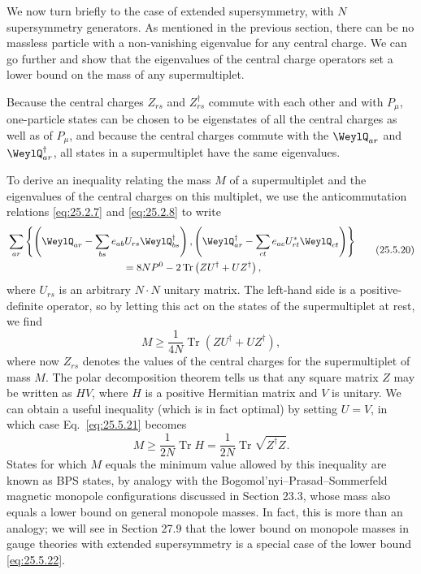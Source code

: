 We now turn briefly to the case of extended supersymmetry, with $N$
supersymmetry generators. As mentioned in the previous section, there can be
no massless particle with a non-vanishing eigenvalue for any central charge.
We can go further and show that the eigenvalues of the central charge
operators set a lower bound on the mass of any supermultiplet.

Because the central charges $Z_{rs}$ and $Z_{rs}^\dagger$ commute with each
other and with $P_\mu$, one-particle states can be chosen to be eigenstates of
all the central charges as well as of $P_\mu$, and because the central charges
commute with the $\WeylQ_{ar}$ and $\WeylQ_{ar}^\dagger$, all states in a
supermultiplet have the same eigenvalues.

To derive an inequality relating the mass $M$ of a supermultiplet and the
eigenvalues of the central charges on this multiplet, we use the
anticommutation relations \eqref{eq:25.2.7} and \eqref{eq:25.2.8} to write
\begin{equation}
\begin{aligned}
 &\sum_{ar}\left\{
 \left(\WeylQ_{ar}-\sum_{bs}e_{ab}U_{rs}\WeylQ_{bs}^\dagger\right),
 \left(\WeylQ_{ar}^\dagger
       -\sum_{ct}e_{ac}U_{rt}^*\WeylQ_{ct}\right)
 \right\}
 \\
 &\hspace{4cm}
 =8NP^0-2\operatorname{Tr}\left(ZU^\dagger+UZ^\dagger\right),
\end{aligned}
\tag{25.5.20}\label{eq:25.5.20}
\end{equation}
where $U_{rs}$ is an arbitrary $N\cdot N$ unitary matrix. The left-hand side
is a positive-definite operator, so by letting this act on the states of the
supermultiplet at rest, we find
\begin{equation}
 M\geq\frac{1}{4N}\operatorname{Tr}
 \left(ZU^\dagger+UZ^\dagger\right),
\tag{25.5.21}\label{eq:25.5.21}
\end{equation}
where now $Z_{rs}$ denotes the values of the central charges for the
supermultiplet of mass $M$. The polar decomposition theorem tells us that any
square matrix $Z$ may be written as $HV$, where $H$ is a positive Hermitian
matrix and $V$ is unitary. We can obtain a useful inequality (which is in fact
optimal) by setting $U=V$, in which case Eq.~\eqref{eq:25.5.21} becomes
\begin{equation}
 M\geq\frac{1}{2N}\operatorname{Tr}H
 =\frac{1}{2N}\operatorname{Tr}\sqrt{Z^\dagger Z}.
\tag{25.5.22}\label{eq:25.5.22}
\end{equation}
States for which $M$ equals the minimum value allowed by this inequality are
known as BPS states, by analogy with the
Bogomol'nyi--Prasad--Sommerfeld magnetic monopole configurations discussed in
Section 23.3, whose mass also equals a lower bound on general monopole masses.
In fact, this is more than an analogy; we will see in Section 27.9 that the
lower bound on monopole masses in gauge theories with extended supersymmetry
is a special case of the lower bound \eqref{eq:25.5.22}.

